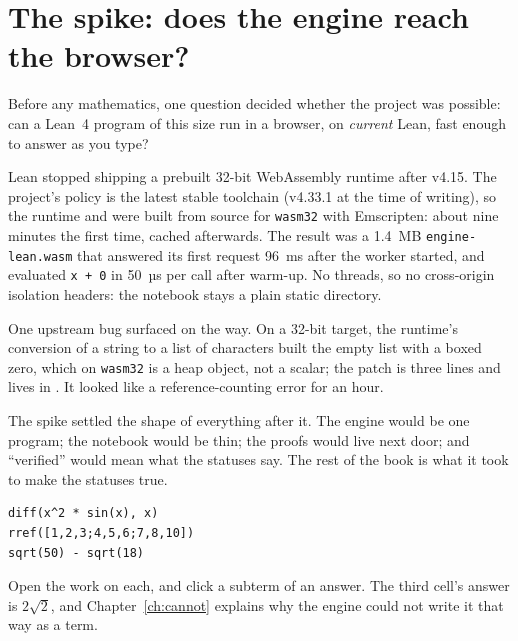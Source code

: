 \section{The spike: does the engine reach the browser?}

Before any mathematics, one question decided whether the project was possible: can a Lean~4
program of this size run in a browser, on \emph{current} Lean, fast enough to answer as you type?

\begin{logbox}[Milestone 0]
  Lean stopped shipping a prebuilt 32-bit WebAssembly runtime after v4.15. The project's policy is
  the latest stable toolchain (v4.33.1 at the time of writing), so the runtime and  were
  built from source for \texttt{wasm32} with Emscripten: about nine minutes the first time, cached
  afterwards. The result was a 1.4~MB \texttt{engine-lean.wasm} that answered its first request
  96~ms after the worker started, and evaluated \texttt{x + 0} in 50~µs per call after warm-up. No
  threads, so no cross-origin isolation headers: the notebook stays a plain static directory.

  One upstream bug surfaced on the way. On a 32-bit target, the runtime's conversion of a string
  to a list of characters built the empty list with a boxed  zero, which on
  \texttt{wasm32} is a heap object, not a scalar; the patch is three lines and lives in
  . It looked like a reference-counting error for an hour.
\end{logbox}

The spike settled the shape of everything after it. The engine would be one program; the
notebook would be thin; the proofs would live next door; and ``verified'' would mean what the
statuses say. The rest of the book is what it took to make the statuses true.

\begin{trybox}
\begin{verbatim}
diff(x^2 * sin(x), x)
rref([1,2,3;4,5,6;7,8,10])
sqrt(50) - sqrt(18)
\end{verbatim}
  Open the work on each, and click a subterm of an answer. The third cell's answer is $2\sqrt{2}$,
  and Chapter~\ref{ch:cannot} explains why the engine could not write it that way as a term.
\end{trybox}
